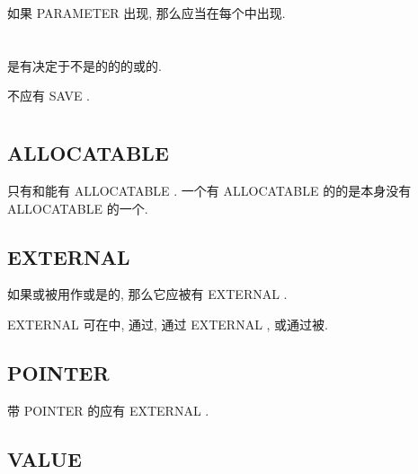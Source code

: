 如果 PARAMETER \Keyword{}出现, 那么\tit{\Initialization{}}应当在每个\tit{\Entity{}\Declaration{}}中出现.

\section{\Automatic{}\Data{}\Object{}}

\Automatic{}\Data{}\Object{}是有决定于不是\Constant{}\Expression{}的\tit{\Specification{}\Expression{}}的\Value{}的\TypeParameter{}或\Array{}\Bound{}的\Nondummy{}\Data{}\Object{}.

\Automatic{}\Data{}\Object{}不应有 SAVE \Attribute{}.

\section{\Attribute{}}

\subsection{ ALLOCATABLE \Attribute{}}

只有\Variable{}和\Component{}能有 ALLOCATABLE \Attribute{}. \Reference{}一个\Result{}\Variable{}有 ALLOCATABLE \Attribute{}的\Function{}的\Result{}是本身没有 ALLOCATABLE \Attribute{}的一个\Value{}.

\subsection{ EXTERNAL \Attribute{}}

如果\ExternalProcedure{}或\Dummy{}\Procedure{}被用作\ActualArgument{}或是\Procedure{}\Pointer{}\Assignment{}的\Target{}, 那么它应被\Declare{}有 EXTERNAL \Attribute{}.

EXTERNAL \Attribute{}可在\Type{}\Declaration{}\Statement{}中, 通过\InterfaceBody{}, 通过 EXTERNAL \Statement{}, 或通过\Procedure{}\Declaration{}\Statement{}被\Specify{}.

\subsection{ POINTER \Attribute{}}

带 POINTER \Attribute{}的\Procedure{}应有 EXTERNAL \Attribute{}.

\subsection{ VALUE \Attribute{}}

